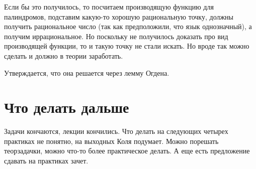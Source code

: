 Если бы это получилось, то посчитаем производящую функцию для палиндромов, подставим какую-то хорошую рациональную точку, 
должны получить рациональное число (так как предположили, что язык однозначный), а получим иррациональное.
Но поскольку не получилось доказать про вид производящей функции, то и такую точку не стали искать. 
Но вроде так можно сделать и должно в теории заработать.

Утверждается, что она решается через лемму Огдена.


\section{Что делать дальше}
Задачи кончаются, лекции кончились. 
Что делать на следующих четырех практиках не понятно, на выходных Коля подумает. 
Можно порешать теорзадачки, можно что-то более практическое делать.
А еще есть предложение сдавать на практиках зачет.

